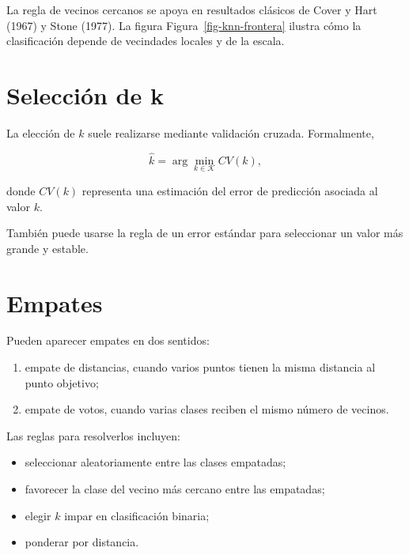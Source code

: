 \documentclass[
  spanish,
  10.5pt,
  letterpaper,
  DIV=11,
  numbers=noendperiod,
  oneside,
  open=any]{scrreprt}
\providecommand{\tightlist}{%
  \setlength{\itemsep}{0pt}\setlength{\parskip}{0pt}}
\theoremstyle{definition}
\theoremstyle{definition}
\theoremstyle{plain}
\theoremstyle{remark}
\begin{document}
La regla de vecinos cercanos se apoya en resultados clásicos de Cover y
Hart (1967) y Stone (1977). La figura Figura~\ref{fig-knn-frontera}
ilustra cómo la clasificación depende de vecindades locales y de la
escala.

\section*{Selección de k}\label{selecciuxf3n-de-k}


La elección de \(k\) suele realizarse mediante validación cruzada.
Formalmente,

\[
\widehat{k}
=
\arg\min_{k\in\mathcal{K}} CV(k),
\]

donde \(CV(k)\) representa una estimación del error de predicción
asociada al valor \(k\).

También puede usarse la regla de un error estándar para seleccionar un
valor más grande y estable.

\section*{Empates}\label{empates}


Pueden aparecer empates en dos sentidos:

\begin{enumerate}
\def\labelenumi{\arabic{enumi}.}
\tightlist
\item
  empate de distancias, cuando varios puntos tienen la misma distancia
  al punto objetivo;
\item
  empate de votos, cuando varias clases reciben el mismo número de
  vecinos.
\end{enumerate}

Las reglas para resolverlos incluyen:

\begin{itemize}
\tightlist
\item
  seleccionar aleatoriamente entre las clases empatadas;
\item
  favorecer la clase del vecino más cercano entre las empatadas;
\item
  elegir \(k\) impar en clasificación binaria;
\item
  ponderar por distancia.
\end{itemize}
\end{document}
